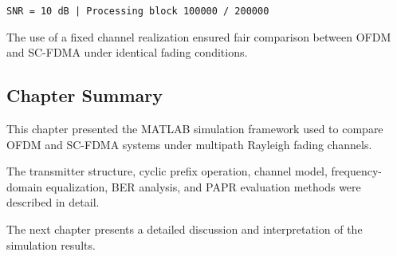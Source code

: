 \begin{center}
\texttt{SNR = 10 dB | Processing block 100000 / 200000}
\end{center}

The use of a fixed channel realization ensured fair comparison between
OFDM and SC-FDMA under identical fading conditions.

\subsection{Chapter Summary}

This chapter presented the MATLAB simulation framework used to compare
OFDM and SC-FDMA systems under multipath Rayleigh fading channels.

The transmitter structure, cyclic prefix operation, channel model,
frequency-domain equalization, BER analysis, and PAPR evaluation methods
were described in detail.

The next chapter presents a detailed discussion and interpretation of the
simulation results.